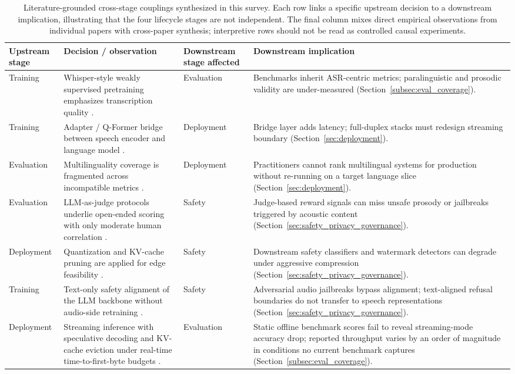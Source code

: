 \begin{table}[t]
\caption{Literature-grounded cross-stage couplings synthesized in this
survey. Each row links a specific upstream decision to a downstream
implication, illustrating that the four lifecycle stages are not
independent. The final column mixes direct empirical observations from
individual papers with cross-paper synthesis; interpretive rows should
not be read as controlled causal experiments.}
\label{tab:coupling_evidence}
\centering
\footnotesize
\begin{tabularx}{\textwidth}{p{}XXX}
\toprule
\textbf{Upstream stage} & \textbf{Decision / observation} &
\textbf{Downstream stage affected} & \textbf{Downstream implication} \\
\midrule
Training &
Whisper-style weakly supervised pretraining emphasizes transcription
quality \citep{radford2023robust}. &
Evaluation &
Benchmarks inherit ASR-centric metrics; paralinguistic and prosodic
validity are under-measured (Section~\ref{subsec:eval_coverage}). \\
\midrule
Training &
Adapter / Q-Former bridge between speech encoder and language model
\citep{tang2023salmonn,fan2025alignformer}. &
Deployment &
Bridge layer adds latency; full-duplex stacks must redesign streaming
boundary (Section~\ref{sec:deployment}). \\
\midrule
Evaluation &
Multilinguality coverage is fragmented across incompatible metrics
\citep{liu2025seallmsaudio,papi2025hearing2translate}. &
Deployment &
Practitioners cannot rank multilingual systems for production without
re-running on a target language slice (Section~\ref{sec:deployment}). \\
\midrule
Evaluation &
LLM-as-judge protocols underlie open-ended scoring with only moderate
human correlation \citep{ao2024sdeval,zheng2023judging}. &
Safety &
Judge-based reward signals can miss unsafe prosody or jailbreaks
triggered by acoustic content (Section~\ref{sec:safety_privacy_governance}). \\
\midrule
Deployment &
Quantization and KV-cache pruning are applied for edge feasibility
\citep{xie2024miniomni}. &
Safety &
Downstream safety classifiers and watermark detectors can degrade
under aggressive compression
(Section~\ref{sec:safety_privacy_governance}). \\
\midrule
Training &
Text-only safety alignment of the LLM backbone without audio-side
retraining \citep{yang2024audioachillesheelred}. &
Safety &
Adversarial audio jailbreaks bypass alignment; text-aligned refusal
boundaries do not transfer to speech representations
(Section~\ref{sec:safety_privacy_governance}). \\
\midrule
Deployment &
Streaming inference with speculative decoding and KV-cache eviction
under real-time time-to-first-byte budgets
\citep{kamahori2026voxserve,wei2025specasr}. &
Evaluation &
Static offline benchmark scores fail to reveal streaming-mode accuracy
drop; reported throughput varies by an order of magnitude in conditions
no current benchmark captures (Section~\ref{subsec:eval_coverage}). \\
\bottomrule
\end{tabularx}
\end{table}
\FloatBarrier